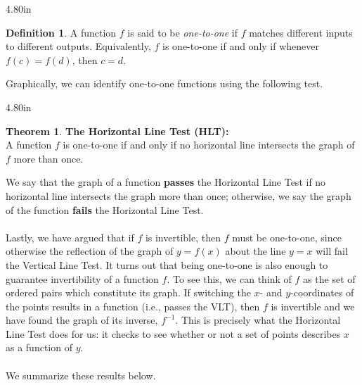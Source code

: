 \documentclass[11pt]{book}
\theoremstyle{definition}  %
\newtheorem*{defn}{Definition}%
\newtheorem{thm}{Theorem}[chapter] %
\newcommand{\bbm}{\begin{boxedminipage}{4.80in}} %
\newcommand{\ebm}{\end{boxedminipage}}
\begin{document}

\colorbox{ResultColor}{\bbm

\begin{defn} \label{onetoone} A function $f$ is said to be  \textit{one-to-one} if $f$ matches different inputs to different outputs.  Equivalently, $f$ is one-to-one if and only if  whenever $f(c) = f(d)$, then $c=d$. 

\end{defn}
\ebm}


Graphically, we can identify one-to-one functions using the following test.\\


\colorbox{ResultColor}{\bbm

\begin{thm}  \textbf{The Horizontal Line Test (HLT):}\\
A function $f$ is one-to-one if and only if no horizontal line intersects the graph of $f$ more than once.

\label{HLT}

\end{thm}

\ebm}

\smallskip

We say that the graph of a function \textbf{passes} the Horizontal Line Test  if no horizontal line intersects the graph more than once; otherwise, we say the graph of the function \textbf{fails} the Horizontal Line Test.\\
~\\
Lastly, we have argued that if $f$ is invertible, then $f$ must be one-to-one, since otherwise the reflection of the graph of $y = f(x)$ about the line $y = x$ will fail the Vertical Line Test.  It turns out that being one-to-one is also enough to guarantee invertibility of a function $f$.  To see this, we can think of $f$ as the set of ordered pairs which constitute its graph.  If switching the $x$- and $y$-coordinates of the points results in a function (i.e., passes the VLT), then $f$ is invertible and we have found the graph of its inverse, $f^{-1}$. This is precisely what the Horizontal Line Test does for us: it checks to see whether or not a set of points describes $x$ as a function of $y$.\\
~\\
We summarize these results below.\\
\end{document}
